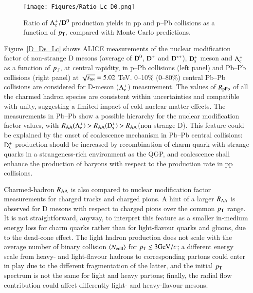 \documentclass{webofc}
\newcommand{\sqrtsNN}{\sqrt{s_{\rm \scriptscriptstyle NN}}}
\newcommand{\gevc}{\mathrm{GeV}/c}
\newcommand{\Raa}{R_{\rm AA}}
\newcommand{\pt}{p_{\rm T}}
\newcommand{\Dzero}{{\rm D^0}}
\newcommand{\Dstar}{{\rm D^{*+}}}
\newcommand{\Dplus}{{\rm D^+}}
\newcommand{\Lc}{\Lambda^+_{\rm c}}
\newcommand{\Ds}{{\rm D}^+_{\rm s}}
\begin{document}
\begin{figure*}
\centering
\texttt{[image: Figures/Ratio\_Lc\_D0.png]}
\caption{Ratio of $\Lambda^+_{\rm c}/ \Dzero$ production yields in pp and p--Pb collisions as a function of $\pt$, compared with Monte Carlo predictions.}
\label{LcDoRatio}       %
\end{figure*}

Figure~\ref{D_Ds_Lc} shows ALICE measurements of the nuclear modification factor of non-strange D mesons (average of $\Dzero$, $\Dplus$ and $\Dstar$), $\Ds$ meson and $\Lc$ as a function of $\pt$, at central rapidity, in p--Pb collisions (left panel) and Pb--Pb collisions (right panel) at $\sqrtsNN = 5.02$ TeV. 0--10\% (0--80\%) central Pb--Pb collisions are considered for D-meson ($\Lc$) measurement.
The values of $R_{\rm pPb}$ of all the charmed hadron species are consistent within uncertainties and compatible with unity, suggesting a limited impact of cold-nuclear-matter effects. The measurements in Pb--Pb show a possible hierarchy for the nuclear modification factor values, with $R_{\rm AA}(\Lc) > R_{\rm AA}(\Ds) > R_{\rm AA}$(non-strange D). This feature could be explained by the onset of coalescence mechanism in Pb--Pb central collisions: $\Ds$ production should be increased by recombination of charm quark with strange quarks in a strangeness-rich environment as the QGP, and coalescence shall enhance the production of baryons with respect to the production rate in pp collisions.

Charmed-hadron $\Raa$ is also compared to nuclear modification factor measurements for charged tracks and charged pions. A hint of a larger $\Raa$ is observed for D mesons with respect to charged pions over the common $\pt$ range. It is not straightforward, anyway, to interpret this feature as a smaller in-medium energy loss for charm quarks rather than for light-flavour quarks and gluons, due to the dead-cone effect. The light hadron production does not scale with the average number of binary collision $\langle N_{\rm coll} \rangle$ for $\pt \leq 3 \gevc$; a different energy scale from heavy- and light-flavour hadrons to corresponding partons could enter in play due to the different fragmentation of the latter, and the initial $\pt$ spectrum is not the same for light and heavy partons; finally, the radial flow contribution could affect differently light- and heavy-flavour mesons.
\end{document}
